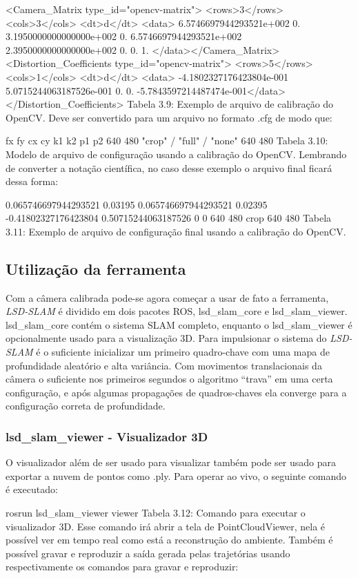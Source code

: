 <Camera\_Matrix type\_id="opencv-matrix">
<rows>3</rows>
<cols>3</cols>
<dt>d</dt>
<data>
 6.5746697944293521e+002 0. 3.1950000000000000e+002
 0. 6.5746697944293521e+002 2.3950000000000000e+002
 0. 0. 1.
</data></Camera\_Matrix>
<Distortion\_Coefficients type\_id="opencv-matrix">
<rows>5</rows>
<cols>1</cols>
<dt>d</dt>
<data>
 -4.1802327176423804e-001 5.0715244063187526e-001 0. 0. -5.7843597214487474e-001</data></Distortion\_Coefficients>
Tabela 3.9: Exemplo de arquivo de calibração do OpenCV.
Deve ser convertido para um arquivo no formato .cfg de modo que:

fx fy cx cy k1 k2 p1 p2
640 480
"crop" / "full" / "none"
640 480
Tabela 3.10: Modelo de arquivo de configuração usando a calibração do OpenCV.
Lembrando de converter a notação científica, no caso desse exemplo o arquivo final ficará dessa forma:


0.065746697944293521 0.03195 0.065746697944293521 0.02395 -0.41802327176423804 0.50715244063187526 0 0 
640 480
crop
640 480
Tabela 3.11: Exemplo de arquivo de configuração final usando a calibração do OpenCV.

\subsection{Utilização da ferramenta}

Com a câmera calibrada pode-se agora começar a usar de fato a ferramenta, \textit{LSD-SLAM} é dividido em dois pacotes ROS, lsd\_slam\_core e lsd\_slam\_viewer. lsd\_slam\_core contém o sistema SLAM completo, enquanto o lsd\_slam\_viewer é opcionalmente usado para a visualização 3D.
Para impulsionar o sistema do \textit{LSD-SLAM} é o suficiente inicializar um primeiro quadro-chave com uma mapa de profundidade aleatório e alta variância. Com movimentos translacionais da câmera o suficiente nos primeiros segundos o algoritmo “trava” em uma certa configuração, e após algumas propagações de quadros-chaves ela converge para a configuração correta de profundidade.

\subsubsection{lsd\_slam\_viewer - Visualizador 3D}

O visualizador além de ser usado para visualizar também pode ser usado para exportar a nuvem de pontos como .ply. Para operar ao vivo, o seguinte comando é executado:

rosrun lsd\_slam\_viewer viewer
Tabela 3.12: Comando para executar o visualizador 3D.
Esse comando irá abrir a tela de PointCloudViewer, nela é possível ver em tempo real como está a reconstrução do ambiente. Também é possível gravar e reproduzir a saída gerada pelas trajetórias usando respectivamente os comandos para gravar e reproduzir:

